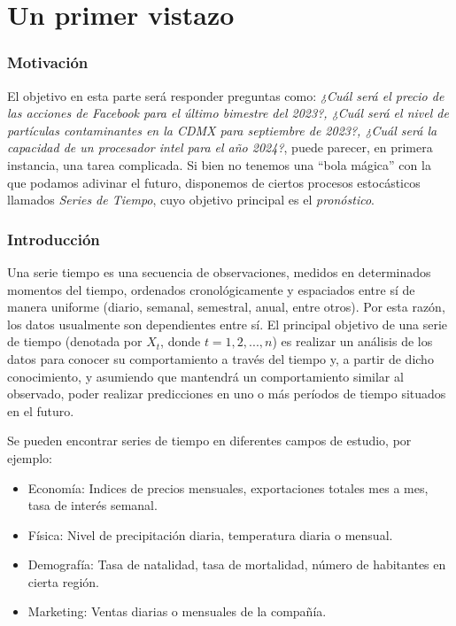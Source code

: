 \documentclass[
  a4paper,
  oneside,
  openany]{book}
\providecommand{\tightlist}{%
  \setlength{\itemsep}{0pt}\setlength{\parskip}{0pt}}
\begin{document}
\hypertarget{part-un-primer-vistazo}{%
\part{Un primer vistazo}\label{part-un-primer-vistazo}}

\hypertarget{motivaciuxf3n}{%
\section*{Motivación}\label{motivaciuxf3n}}


El objetivo en esta parte será responder preguntas como: \emph{¿Cuál será el precio de las acciones de Facebook para el último bimestre del 2023?, ¿Cuál será el nivel de partículas contaminantes en la CDMX para septiembre de 2023?, ¿Cuál será la capacidad de un procesador intel para el año 2024?}, puede parecer, en primera instancia, una tarea complicada. Si bien no tenemos una ``bola mágica'' con la que podamos adivinar el futuro, disponemos de ciertos procesos estocásticos llamados \emph{Series de Tiempo}, cuyo objetivo principal es el \emph{pronóstico}.

\hypertarget{introducciuxf3n}{%
\section*{Introducción}\label{introducciuxf3n}}


Una serie tiempo es una secuencia de observaciones, medidos en determinados momentos del tiempo, ordenados cronológicamente y espaciados entre sí de manera uniforme (diario, semanal, semestral, anual, entre otros). Por esta razón, los datos usualmente son dependientes entre sí. El principal objetivo de una serie de tiempo (denotada por \(X_{t}\), donde \(t=1,2,...,n\)) es realizar un análisis de los datos para conocer su comportamiento a través del tiempo y, a partir de dicho conocimiento, y asumiendo que mantendrá un comportamiento similar al observado, poder realizar predicciones en uno o más períodos de tiempo situados en el futuro.

Se pueden encontrar series de tiempo en diferentes campos de estudio, por ejemplo:

\begin{itemize}
\tightlist
\item
  Economía: Indices de precios mensuales, exportaciones totales mes a mes, tasa de interés semanal.
\item
  Física: Nivel de precipitación diaria, temperatura diaria o mensual.
\item
  Demografía: Tasa de natalidad, tasa de mortalidad, número de habitantes en cierta región.
\item
  Marketing: Ventas diarias o mensuales de la compañía.
\end{itemize}
\end{document}
